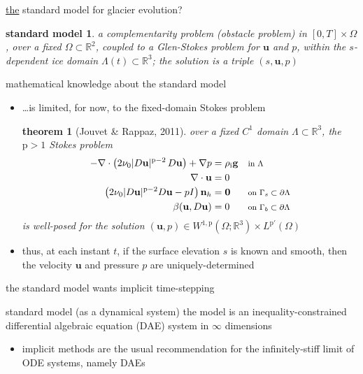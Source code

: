 \documentclass[10pt,svgnames]{beamer}
\newtheorem*{thm}{theorem}
\newcommand{\bg}{\mathbf{g}}
\newcommand{\bn}{\mathbf{n}}
\newcommand{\bu}{\mathbf{u}}
\newcommand{\bzero}{\bm{0}}
\newcommand{\RR}{\mathbb{R}}
\newcommand{\pp}{\mathrm{p}}
\newcommand{\rhoi}{\rho_{\text{i}}}
\newcommand{\where}[1]{\text{\footnotesize #1}}
\newcommand{\aler}[1]{{\color{FireBrick} #1}}
\begin{document}
\begin{frame}{\underline{the} standard model for glacier evolution?}

\stdblock

\bigskip
\newtheorem*{smodel}{standard model}

\begin{smodel}
a complementarity problem (obstacle problem) in $[0,T]\times \Omega$, over a fixed $\Omega \subset \RR^2$, \aler{coupled} to a Glen-Stokes problem for $\bu$ and $p$, within the $s$-dependent ice domain $\Lambda(t) \subset \RR^3$; the solution is a triple $(s,\bu,p)$
\end{smodel}
\end{frame}


\begin{frame}{mathematical knowledge about the standard model}

\begin{itemize}
\item \dots is limited, for now, to the \aler{fixed-domain Stokes problem}

\begin{thm}[Jouvet \& Rappaz, 2011]
over a fixed $C^1$ domain $\Lambda\subset\RR^3$, the $\pp>1$ Stokes problem
\begin{align*}
- \nabla \cdot \left(2 \nu_0 |D\bu|^{\pp-2}\, D\bu\right) + \nabla p &= \rhoi \bg && \where{in $\Lambda$} \\
\nabla \cdot \bu &= 0 \\
\left(2 \nu_0 |D\bu|^{\pp-2} D\bu - pI\right) \bn_h &= \bzero && \where{on $\Gamma_s\subset\partial\Lambda$} \\
\beta(\bu,D\bu) &= 0 && \where{on $\Gamma_b\subset\partial\Lambda$}
\end{align*}
is well-posed for the solution $(\bu,p) \in W^{1,\pp}(\Omega;\RR^3) \times L^{\pp'}(\Omega)$
\end{thm}

\item thus, at each instant $t$, if the surface elevation $s$ is known and smooth, then the velocity $\bu$ and pressure $p$ are uniquely-determined
\end{itemize}
\end{frame}


\begin{frame}{the standard model wants implicit time-stepping}

{\footnotesize
\stdblock
}

\bigskip
\begin{block}{standard model (as a dynamical system)}
the model is an inequality-constrained \aler{differential algebraic equation} (DAE) system in $\infty$ dimensions
\end{block}

\begin{itemize}
\item \aler{implicit} methods are the usual recommendation for the infinitely-stiff limit of ODE systems, namely DAEs
\end{itemize}
\end{frame}
\end{document}
